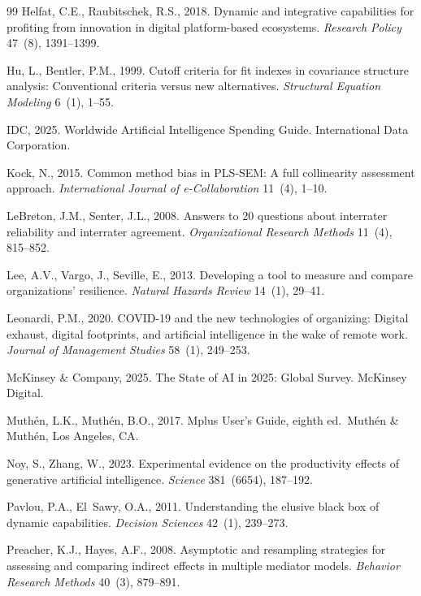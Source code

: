 \documentclass[12pt, a4paper]{article}
\begin{document}
\begin{thebibliography}{99}
Helfat, C.E., Raubitschek, R.S., 2018. Dynamic and integrative capabilities for profiting from innovation in digital platform-based ecosystems. \textit{Research Policy} 47~(8), 1391--1399.

Hu, L., Bentler, P.M., 1999. Cutoff criteria for fit indexes in covariance structure analysis: Conventional criteria versus new alternatives. \textit{Structural Equation Modeling} 6~(1), 1--55.

IDC, 2025. Worldwide Artificial Intelligence Spending Guide. International Data Corporation.

Kock, N., 2015. Common method bias in PLS-SEM: A full collinearity assessment approach. \textit{International Journal of e-Collaboration} 11~(4), 1--10.

LeBreton, J.M., Senter, J.L., 2008. Answers to 20 questions about interrater reliability and interrater agreement. \textit{Organizational Research Methods} 11~(4), 815--852.

Lee, A.V., Vargo, J., Seville, E., 2013. Developing a tool to measure and compare organizations' resilience. \textit{Natural Hazards Review} 14~(1), 29--41.

Leonardi, P.M., 2020. COVID-19 and the new technologies of organizing: Digital exhaust, digital footprints, and artificial intelligence in the wake of remote work. \textit{Journal of Management Studies} 58~(1), 249--253.

McKinsey \& Company, 2025. The State of AI in 2025: Global Survey. McKinsey Digital.

Muth\'{e}n, L.K., Muth\'{e}n, B.O., 2017. Mplus User's Guide, eighth ed.\ Muth\'{e}n \& Muth\'{e}n, Los Angeles, CA.

Noy, S., Zhang, W., 2023. Experimental evidence on the productivity effects of generative artificial intelligence. \textit{Science} 381~(6654), 187--192.

Pavlou, P.A., El~Sawy, O.A., 2011. Understanding the elusive black box of dynamic capabilities. \textit{Decision Sciences} 42~(1), 239--273.

Preacher, K.J., Hayes, A.F., 2008. Asymptotic and resampling strategies for assessing and comparing indirect effects in multiple mediator models. \textit{Behavior Research Methods} 40~(3), 879--891.


\end{thebibliography}
\end{document}
